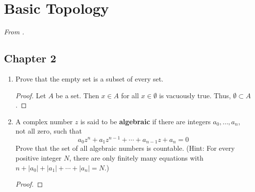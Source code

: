 \documentclass[../psets.tex]{subfiles}
\begin{document}
\section{Basic Topology}
\emph{From \textcite{bib:Rudin}.}
\subsection*{Chapter 2}
\begin{enumerate}[label={\textbf{\arabic*.}}]
    \item {}Prove that the empty set is a subset of every set.
    \begin{proof}
        Let $A$ be a set. Then $x\in A$ for all $x\in\emptyset$ is vacuously true. Thus, $\emptyset\subset A$.
    \end{proof}
    \item A complex number $z$ is said to be \textbf{algebraic} if there are integers $a_0,\dots,a_n$, not all zero, such that
    \begin{equation*}
        a_0z^n+a_1z^{n-1}+\cdots+a_{n-1}z+a_n = 0
    \end{equation*}
    Prove that the set of all algebraic numbers is countable. (Hint: For every positive integer $N$, there are only finitely many equations with $n+|a_0|+|a_1|+\cdots+|a_n|=N$.)
    \begin{proof}

\end{proof}
\end{enumerate}
\end{document}
